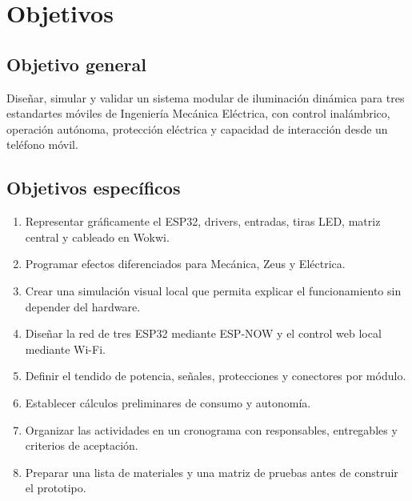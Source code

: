 \documentclass[11pt,a4paper]{article}
\begin{document}
\section{Objetivos}
\subsection{Objetivo general}
Diseñar, simular y validar un sistema modular de iluminación dinámica para tres estandartes móviles de Ingeniería Mecánica Eléctrica, con control inalámbrico, operación autónoma, protección eléctrica y capacidad de interacción desde un teléfono móvil.

\subsection{Objetivos específicos}
\begin{enumerate}
  \item Representar gráficamente el ESP32, drivers, entradas, tiras LED, matriz central y cableado en Wokwi.
  \item Programar efectos diferenciados para Mecánica, Zeus y Eléctrica.
  \item Crear una simulación visual local que permita explicar el funcionamiento sin depender del hardware.
  \item Diseñar la red de tres ESP32 mediante ESP-NOW y el control web local mediante Wi-Fi.
  \item Definir el tendido de potencia, señales, protecciones y conectores por módulo.
  \item Establecer cálculos preliminares de consumo y autonomía.
  \item Organizar las actividades en un cronograma con responsables, entregables y criterios de aceptación.
  \item Preparar una lista de materiales y una matriz de pruebas antes de construir el prototipo.
\end{enumerate}

\end{document}
